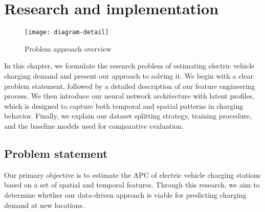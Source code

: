 \setchapterpreamble[u]{\margintoc}
\chapter{Research and implementation}
\label{ch:problem}

\begin{figure}[hb]
    \texttt{[image: diagram-detail]}
    \caption[Problem modelling overview]{Problem approach overview}
\end{figure}

In this chapter, we formulate the research problem of estimating electric vehicle charging demand and present our approach to solving it. We begin with a clear problem statement, followed by a detailed description of our feature engineering process. We then introduce our neural network architecture with latent profiles, which is designed to capture both temporal and spatial patterns in charging behavior. Finally, we explain our dataset splitting strategy, training procedure, and the baseline models used for comparative evaluation.


\section{Problem statement}


Our primary objective is to estimate the \acrfull{APC} of electric vehicle charging stations based on a set of spatial and temporal features. Through this research, we aim to determine whether our data-driven approach is viable for predicting charging demand at new locations.

